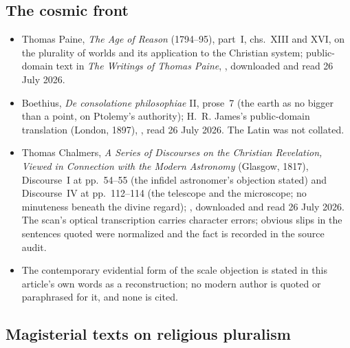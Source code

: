 \subsection*{The cosmic front}

{\fontsize{8.6}{9.6}\selectfont
\begin{itemize}[itemsep=0pt,parsep=0pt,topsep=0.05em]
\item Thomas Paine, \emph{The Age of Reason} (1794--95), part~I, chs.~XIII and XVI, on the plurality of worlds and its application to the Christian system; public-domain text in \emph{The Writings of Thomas Paine}, , downloaded and read 26 July 2026.
\item Boethius, \emph{De consolatione philosophiae} II, prose~7 (the earth as no bigger than a point, on Ptolemy's authority); H.~R. James's public-domain translation (London, 1897), , read 26 July 2026. The Latin was not collated.
\item Thomas Chalmers, \emph{A Series of Discourses on the Christian Revelation, Viewed in Connection with the Modern Astronomy} (Glasgow, 1817), Discourse~I at pp.~54--55 (the infidel astronomer's objection stated) and Discourse~IV at pp.~112--114 (the telescope and the microscope; no minuteness beneath the divine regard); , downloaded and read 26 July 2026. The scan's optical transcription carries character errors; obvious slips in the sentences quoted were normalized and the fact is recorded in the source audit.
\item The contemporary evidential form of the scale objection is stated in this article's own words as a reconstruction; no modern author is quoted or paraphrased for it, and none is cited.
\end{itemize}}

\subsection*{Magisterial texts on religious pluralism}

